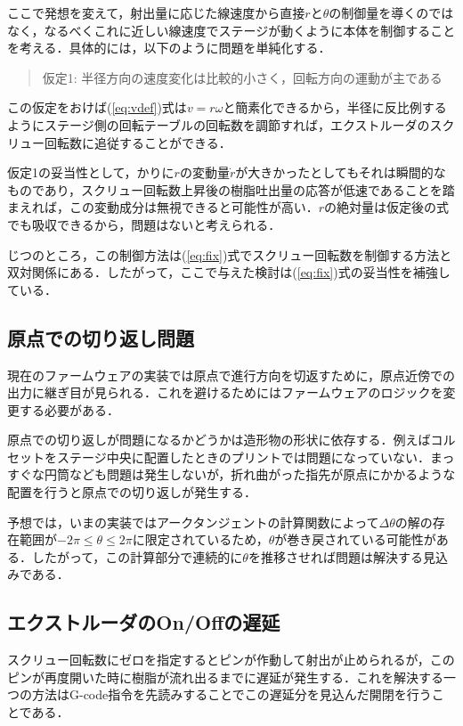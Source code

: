 \documentclass[twocolumn,oneside,a4paper]{article}
\begin{document}
ここで発想を変えて，射出量に応じた線速度から直接$r$と$\theta$の制御量を導くのではなく，なるべくこれに近しい線速度でステージが動くように本体を制御することを考える．具体的には，以下のように問題を単純化する．

\begin{quote}
     仮定1: 半径方向の速度変化は比較的小さく，回転方向の運動が主である
\end{quote}

この仮定をおけば(\ref{eq:vdef})式は$v=r \omega$と簡素化できるから，半径に反比例するようにステージ側の回転テーブルの回転数を調節すれば，エクストルーダのスクリュー回転数に追従することができる．

仮定1の妥当性として，かりに$r$の変動量$\dot{r}$が大きかったとしてもそれは瞬間的なものであり，スクリュー回転数上昇後の樹脂吐出量の応答が低速であることを踏まえれば，この変動成分は無視できると可能性が高い．$r$の絶対量は仮定後の式でも吸収できるから，問題はないと考えられる．

じつのところ，この制御方法は(\ref{eq:fix})式でスクリュー回転数を制御する方法と双対関係にある．したがって，ここで与えた検討は(\ref{eq:fix})式の妥当性を補強している．


\subsection{原点での切り返し問題}
現在のファームウェアの実装では原点で進行方向を切返すために，原点近傍での出力に継ぎ目が見られる．これを避けるためにはファームウェアのロジックを変更する必要がある．

原点での切り返しが問題になるかどうかは造形物の形状に依存する．例えばコルセットをステージ中央に配置したときのプリントでは問題になっていない．まっすぐな円筒なども問題は発生しないが，折れ曲がった指先が原点にかかるような配置を行うと原点での切り返しが発生する．

予想では，いまの実装ではアークタンジェントの計算関数によって$\Delta \theta$の解の存在範囲が$-2 \pi \leq \theta \leq  2 \pi$に限定されているため，$\theta$が巻き戻されている可能性がある．したがって，この計算部分で連続的に$\theta$を推移させれば問題は解決する見込みである．

\subsection{エクストルーダのOn/Offの遅延}
スクリュー回転数にゼロを指定するとピンが作動して射出が止められるが，このピンが再度開いた時に樹脂が流れ出るまでに遅延が発生する．これを解決する一つの方法はG-code指令を先読みすることでこの遅延分を見込んだ開閉を行うことである．
\end{document}
